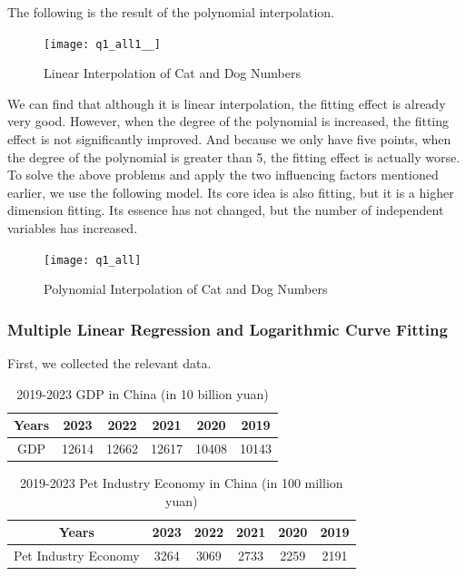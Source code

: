 \documentclass[withoutpreface,bwprint]{cumcmthesis} %
\begin{document}
\par The following is the result of the polynomial interpolation.
\clearpage
\begin{figure}[htbp]
	\centering
	\texttt{[image: q1\_all1\_\_]}
	\caption{Linear Interpolation of Cat and Dog Numbers}
\end{figure}
\par We can find that although it is linear interpolation, the fitting effect is already very good.
However, when the degree of the polynomial is increased, the fitting effect is not significantly improved.
And because we only have five points, when the degree of the polynomial is greater than 5, the fitting effect is actually worse.
To solve the above problems and apply the two influencing factors mentioned earlier, we use the following model.
Its core idea is also fitting, but it is a higher dimension fitting.
Its essence has not changed, but the number of independent variables has increased.
\begin{figure}[htbp]
	\centering
	\texttt{[image: q1\_all]}
	\caption{Polynomial Interpolation of Cat and Dog Numbers}
\end{figure}
\subsubsection{Multiple Linear Regression and Logarithmic Curve Fitting}
\par First, we collected the relevant data.
\clearpage
\begin{table}[!htbp]
    \small
    \caption{2019-2023 GDP in China (in 10 billion yuan)\cite{2}} \centering
    \begin{tabular}{cccccc}
    \toprule[1.5pt]
    Years & 2023 & 2022 & 2021 & 2020 & 2019 \\
    \midrule[1pt]
    GDP & 12614 & 12662 & 12617 & 10408 & 10143 \\
    \bottomrule[1.5pt]
    \end{tabular}
\end{table}
\begin{table}[!htbp]
    \small
    \caption{2019-2023 Pet Industry Economy in China (in 100 million yuan)\cite{3}} \centering
    \begin{tabular}{cccccc}
    \toprule[1.5pt]
    Years & 2023 & 2022 & 2021 & 2020 & 2019 \\
    \midrule[1pt]
    Pet Industry Economy & 3264 & 3069 & 2733 & 2259 & 2191 \\
    \bottomrule[1.5pt]
    \end{tabular}
\end{table}
\end{document}
